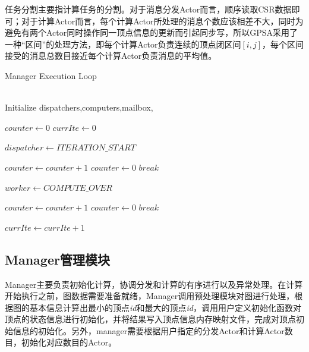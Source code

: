 任务分割主要指计算任务的分割。对于消息分发Actor而言，顺序读取CSR数据即可；对于计算Actor而言，每个计算Actor所处理的消息个数应该相差不大，同时为避免有两个Actor同时操作同一顶点信息的更新而引起同步写，所以GPSA采用了一种“区间”的处理方法，即每个计算Actor负责连续的顶点闭区间$[i,j]$，每个区间接受的消息总数目接近每个计算Actor负责消息的平均值。



\vspace{0.5em}
\begin{algorithm}
{
{

\renewcommand\baselinestretch{1.2}\selectfont %

\caption{Manager Execution Loop}
\label{algo:manager}
\begin{algorithmic}[1]
\REQUIRE ~\\
Initialize dispatchers,computers,mailbox, 

\STATE $counter \leftarrow 0$
\STATE $currIte \leftarrow 0$

\STATE $dispatcher \leftarrow ITERATION\_START$
\ENDFOR

\STATE $counter \leftarrow counter + 1$
\STATE $counter \leftarrow 0$
\STATE $break$
\ENDIF
\ENDWHILE

\STATE $worker \leftarrow COMPUTE\_OVER$
\ENDFOR

\STATE $counter \leftarrow counter + 1$
\STATE $counter \leftarrow 0$
\STATE $break$
\ENDIF
\ENDWHILE

\STATE $currIte \leftarrow currIte + 1$
\ENDWHILE
\end{algorithmic}
}
\par}
\end{algorithm}

\subsection{Manager管理模块}
Manager主要负责初始化计算，协调分发和计算的有序进行以及异常处理。在计算开始执行之前，图数据需要准备就绪，Manager调用预处理模块对图进行处理，根据图的基本信息计算出最小的顶点\textit{id}和最大的顶点\textit{id}，调用用户定义初始化函数对顶点的状态信息进行初始化，并将结果写入顶点信息内存映射文件，完成对顶点初始信息的初始化。另外，manager需要根据用户指定的分发Actor和计算Actor数目，初始化对应数目的Actor。

